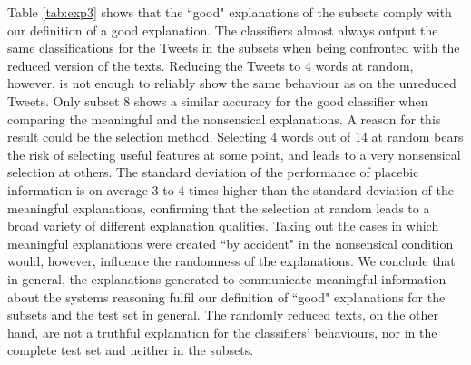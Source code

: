 \noindent Table \ref{tab:exp3} shows that the ``good" explanations of the subsets comply with our definition of a good explanation. The classifiers almost always output the same classifications for the Tweets in the subsets when being confronted with the reduced version of the texts. Reducing the Tweets to $4$ words at random, however, is not enough to reliably show the same behaviour as on the unreduced Tweets. Only subset 8 shows a similar accuracy for the good classifier when comparing the meaningful and the nonsensical explanations. A reason for this result could be the selection method. Selecting 4 words out of 14 at random bears the risk of selecting useful features at some point, and leads to a very nonsensical selection at others. The standard deviation of the performance of placebic information is on average 3 to 4 times higher than the standard deviation of the meaningful explanations, confirming that the selection at random leads to a broad variety of different explanation qualities. Taking out the cases in which meaningful explanations were created ``by accident" in the nonsensical condition would, however, influence the randomness of the explanations.\newline
We conclude that in general, the explanations generated to communicate meaningful information about the systems reasoning fulfil our definition of ``good" explanations for the subsets and the test set in general. The randomly reduced texts, on the other hand, are not a truthful explanation for the classifiers' behaviours, nor in the complete test set and neither in the subsets. 

